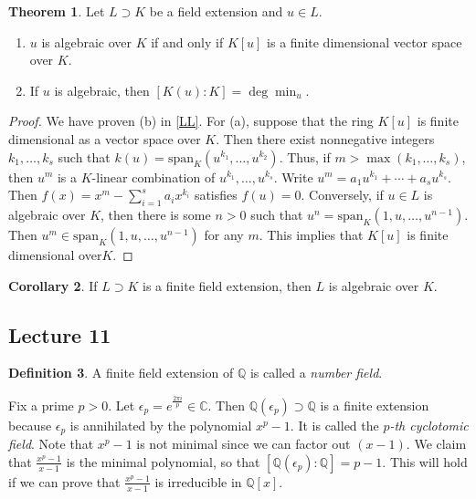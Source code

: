 \documentclass[10pt,letterpaper,cm]{nupset}
\theoremstyle{definition}
\newtheorem{definition}{Definition}[subsection]
\theoremstyle{theorem}
\newtheorem{theorem}[definition]{Theorem}
\newtheorem{corollary}[definition]{Corollary}
\theoremstyle{remark}
\newcommand{\C}{\mathbb C}
\newcommand{\Q}{\mathbb Q}
\newcommand{\1}{\mathbf{1}}
\newcommand{\0}{\vec 0}
\begin{document}
\begin{theorem}
Let $L \supset K$ be a field extension and $u\in L$.
\begin{enumerate}[label=(\alph*)]
\item $u$ is algebraic over $K$ if and only if $K[u]$ is a finite dimensional vector space over $K$.
\item If $u$ is algebraic, then $[K(u) : K] = \deg{\min_u}$. 
\end{enumerate}
\end{theorem}
\begin{proof}
We have proven (b) in \cref{LL}. For (a), suppose that the ring $K[u]$ is finite dimensional as a vector space over $K$. Then there exist nonnegative integers $k_1, \ldots, k_s$ such that $k(u) = \text{span}_K(u^{k_1}, \ldots, u^{k_2})$. Thus, if $m > \max(k_1, \ldots, k_s)$, then $u^m$ is a $K$-linear combination of $u^{k_1}, \ldots, u^{k_s}$. Write $u^m = a_1u^{k_1} + \cdots + a_s u^{k_s}$. Then $f(x) = x^m - \sum_{i=1}^s a_i x^{k_i}$ satisfies  $f(u) = 0$. Conversely, if $u\in L$ is algebraic over $K$, then there is some $n>0$ such that $u^n = \text{span}_K(1, u, \ldots, u^{n-1})$. Then $u^m \in \text{span}_K(1, u, \ldots, u^{n-1})$ for any $m$. This implies that $K[u]$ is finite dimensional over$K$.
\end{proof}

\begin{corollary}
If $L\supset K$ is a finite field extension, then $L$ is algebraic over $K$.
\end{corollary}

\subsection{Lecture 11}

\begin{definition}
A finite field extension of $\Q$ is called a \textit{number field}.
\end{definition}

\smallskip

 Fix a prime $p>0$. Let $\epsilon_p = e^{\frac{2\pi i}{p}} \in \C$. Then $\Q(\epsilon_p) \supset \Q$ is a finite extension because $\epsilon_p$ is annihilated by the polynomial $x^p-1$. It is called the \textit{$p$-th cyclotomic field}. Note that $x^p-1$ is not minimal since we can factor out $(x-1)$. We claim that $\frac{x^p-1}{x-1}$ is the minimal polynomial, so that $[\Q(\epsilon_p) : \Q] =p-1$. This will hold if we can prove that $\frac{x^p-1}{x-1}$ is irreducible in $\Q[x]$.
 
\end{document}
